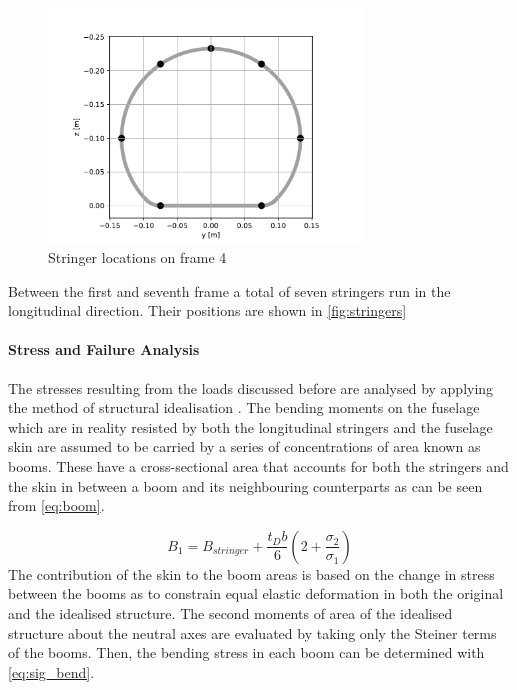 \begin{figure}[H]
    \centering
    \includegraphics[width=0.75\textwidth]{Structures/Figures/figure_2}
    \caption{Stringer locations on frame 4}
    \label{fig:stringers}
\end{figure}

Between the first and seventh frame a total of seven stringers run in the longitudinal direction. Their positions are shown in \autoref{fig:stringers}

\paragraph{Stress and Failure Analysis}

The stresses resulting from the loads discussed before are analysed by applying the method of structural idealisation \cite{megson}. The bending moments on the fuselage which are in reality resisted by both the longitudinal stringers and the fuselage skin are assumed to be carried by a series of concentrations of area known as booms. These have a cross-sectional area that accounts for both the stringers and the skin in between a boom and its neighbouring counterparts as can be seen from \autoref{eq:boom}.

\begin{equation}
\label{eq:boom}
    B_{1} = B_{stringer}+\frac{t_{D}b}{6}\left ( 2+\frac{\sigma _{2}}{\sigma _{1}} \right )
\end{equation}
 The contribution of the skin to the boom areas is based on the change in stress between the booms as to constrain equal elastic deformation in both the original and the idealised structure. The second moments of area of the idealised structure about the neutral axes are evaluated by taking only the Steiner terms of the booms. Then, the bending stress in each boom can be determined with \autoref{eq:sig_bend}.
 
